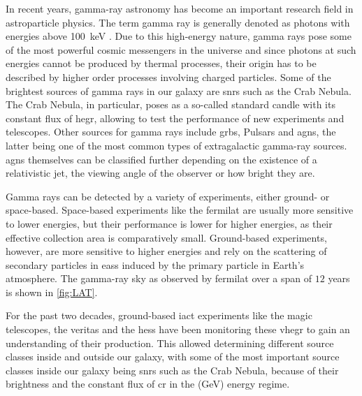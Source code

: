 In recent years, gamma-ray astronomy has become an important research field in astroparticle physics.
The term gamma ray is generally denoted as photons with energies above \SI{100}{\kilo\eV}
\cite{funk}. Due to this high-energy nature, gamma rays pose some of the most powerful cosmic messengers in
the universe and since photons at such energies cannot be produced by thermal processes, their origin
has to be described by higher order processes involving charged particles.
Some of the brightest sources of gamma rays in our galaxy are \glspl{snr} such as the Crab Nebula.
The Crab Nebula, in particular, poses as a so-called standard candle with its constant flux of
\gls{hegr}, allowing to test the performance of new experiments and telescopes. Other sources for
gamma rays include \glspl{grb}, Pulsars and \glspl{agn}, the latter being one of the most common types
of extragalactic gamma-ray sources.
\glspl{agn} themselves can be classified further depending on the existence
of a relativistic jet, the viewing angle of the observer or how bright they are.

Gamma rays can be detected by a variety of experiments, either ground- or space-based. Space-based
experiments like the \gls{fermilat} are usually more sensitive to lower energies, but their performance
is lower for higher energies, as their effective collection area is comparatively small. Ground-based
experiments, however, are more sensitive to higher energies and rely on the scattering
of secondary particles in \glspl{eas} induced by the primary particle in Earth's atmosphere.
The gamma-ray sky as observed by \gls{fermilat} over a span of
\(\num{12}\) years is shown in \autoref{fig:LAT}.

For the past two decades, ground-based \gls{iact} experiments like the \gls{magic} telescopes, the
\gls{veritas} and the \gls{hess} have been monitoring these \gls{vhegr} to gain an understanding of
their production. This allowed determining different source classes inside and outside our galaxy,
with some of the most important source classes inside our galaxy being \glspl{snr} such as the Crab Nebula,
because of their brightness and the constant flux of \gls{cr} in the (\si{\giga\eV}) energy regime.





